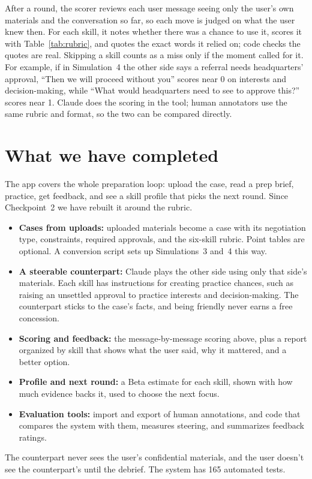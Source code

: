 \documentclass[11pt]{article}
\makeatletter
\renewcommand\paragraph{\@startsection{paragraph}{4}{\z@}{0.7ex \@plus 0.3ex}{-1em}{\normalfont\normalsize\bfseries}}
\makeatother
\begin{document}
\paragraph{How a transcript is scored:}
After a round, the scorer reviews each user message seeing only the user's own materials
and the conversation so far, so each move is judged on what the user knew then. For each
skill, it notes whether there was a chance to use it, scores it with
Table~\ref{tab:rubric}, and quotes the exact words it relied on; code checks the quotes
are real. Skipping a skill counts as a miss only if the moment called for it. For
example, if in Simulation~4 the other side says a referral needs headquarters' approval,
``Then we will proceed without you'' scores near 0 on interests and decision-making,
while ``What would headquarters need to see to approve this?'' scores near 1. Claude does
the scoring in the tool; human annotators use the same rubric and format, so the two can
be compared directly.

\section{What we have completed}

The app covers the whole preparation loop: upload the case, read a prep brief, practice,
get feedback, and see a skill profile that picks the next round. Since Checkpoint~2 we
have rebuilt it around the rubric.
\begin{itemize}
\item \textbf{Cases from uploads:} uploaded materials become a case with its negotiation
type, constraints, required approvals, and the six-skill rubric. Point tables are
optional. A conversion script sets up Simulations~3 and~4 this way.
\item \textbf{A steerable counterpart:} Claude plays the other side using only that
side's materials. Each skill has instructions for creating practice chances, such as
raising an unsettled approval to practice interests and decision-making. The counterpart
sticks to the case's facts, and being friendly never earns a free concession.
\item \textbf{Scoring and feedback:} the message-by-message scoring above, plus a report
organized by skill that shows what the user said, why it mattered, and a better option.
\item \textbf{Profile and next round:} a Beta estimate for each skill, shown with how
much evidence backs it, used to choose the next focus.
\item \textbf{Evaluation tools:} import and export of human annotations, and code that
compares the system with them, measures steering, and summarizes feedback ratings.
\end{itemize}
The counterpart never sees the user's confidential materials, and the user doesn't see
the counterpart's until the debrief. The system has 165 automated tests.
\end{document}
